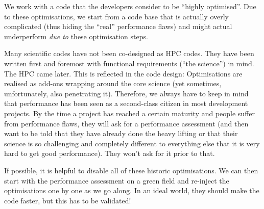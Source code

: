 \begin{assessmentcrime}
 We work with a code that the developers consider to be ``highly optimised''. 
 Due to these optimisations, we start from a code base that is actually overly complicated (thus hiding the ``real'' performance flaws) and might actual underperform \emph{due to} these optimisation steps.
\end{assessmentcrime}


\noindent
Many scientific codes have not been co-designed as HPC codes.
They have been written first and foremost with functional requirements (``the science'') in mind.
The HPC came later.
This is reflected in the code design:
Optimisations are realised as add-ons wrapping around the core science (yet sometimes, unfortunately, also penetrating it).
Therefore, we always have to keep in mind that performance has been seen as a second-class citizen in most development projects. 
By the time a project has reached a certain maturity and people suffer from performance flaws, they will ask for a performance assessment (and then want to be told that they have already done the heavy lifting or that their science is so challenging and completely different to everything else that it is very hard to get good performance).
They won't ask for it prior to that. 


If possible, it is helpful to disable all of these historic optimisations.
We can then start with the performance assessment on a green field and re-inject the optimisations one by one as we go along. 
In an ideal world, they should make the code faster, but this has to be validated!

